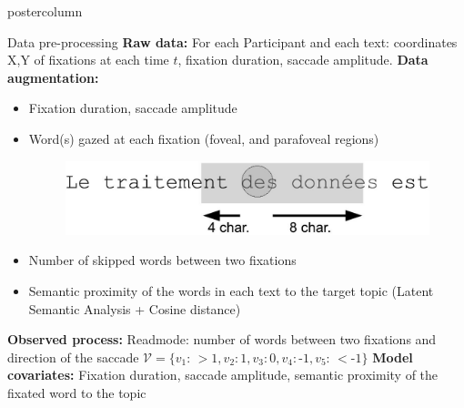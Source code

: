 \documentclass[final,hyperref={pdfpagelabels=false}]{beamer}
\begin{document}
\begin{frame}
\begin{columns}
\begin{column}{.50\textwidth}
\begin{beamercolorbox}[center,wd=\textwidth]{postercolumn}
\begin{minipage}[T]{.98\textwidth}
{            \vfill
            \begin{block}{Data pre-processing}
                \textbf{Raw data:} For each Participant and each text: coordinates X,Y of fixations at each time $t$,
                fixation duration, saccade amplitude.
                \vskip0.5cm
                \textbf{Data augmentation:}
                \begin{itemize}
                    \item[\bullet] Fixation duration, saccade amplitude
                    \item[\bullet]
                    \begin{minipage}{0.50\textwidth}
                        Word(s) gazed at each fixation (foveal, and parafoveal regions)
                    \end{minipage}
                    \begin{minipage}{0.40\textwidth}
                        \begin{figure}[H]
                            \includegraphics[width=0.8\linewidth]{fixation_window.jpg}
                        \end{figure}
                    \end{minipage}
                    \item[\bullet] Number of skipped words between two fixations
                    \item[\bullet] Semantic proximity of the words in each text to the target topic (Latent Semantic Analysis + Cosine distance)
                \end{itemize}
                \vskip0.5cm
                \textbf{Observed process:} Readmode:  number of words between two fixations and direction of the saccade
                $\mathcal{V} =\{ v_1:\,> \text{1}, v_2: \text{1}, v_3: \text{0}, v_4: \text{-1}, v_5:\,< \text{-1}\} $
                \vskip0.5cm
                \textbf{Model covariates:} Fixation duration, saccade amplitude, semantic proximity of the fixated word to the topic


\end{block}}
\end{minipage}
\end{beamercolorbox}
\end{column}
\end{columns}
\end{frame}
\end{document}
